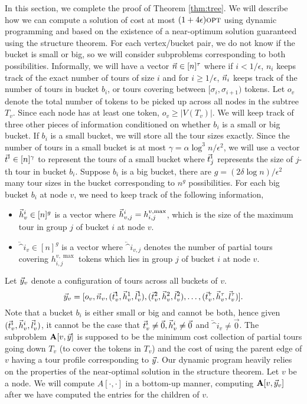 \documentclass[twoside,leqno]{article}
\newcommand{\opt}{\mbox{\sc opt}}
\newcommand{\eps}{\epsilon}
\begin{document}
In this section, we complete the proof of Theorem \ref{thm:tree}. We will describe how we can compute a solution of cost at most $(1 + 4\eps)\opt$ using dynamic programming and based on the existence of a near-optimum solution guaranteed using the structure theorem.
For each vertex/bucket pair, we do not know if the bucket is small or big, so we will consider subproblems corresponding to both possibilities. Informally, we will have a vector $\vec{n} \in [n]^{\tau}$ where if $i < 1/\eps$, $n_i$ keeps track of the exact number of tours of size $i$ and for $i \ge 1/\eps$, $\vec{n}_i$ keeps track of the number of tours in bucket $b_i$, or tours covering between $[\sigma_i, \sigma_{i+1})$ tokens. Let $o_v$ denote the total number of tokens to be picked up across all nodes in the subtree $T_v$. Since each node has at least one token, $o_v \ge |V(T_v)|$. We will keep track of three other pieces of information conditioned on whether $b_i$ is a small or big bucket. If $b_i$ is a small bucket, we will store all the tour sizes exactly. Since the number of tours in a small bucket is at most $\gamma = \alpha \log^3n /\eps^2$, we will use a vector $\vec{t}^i \in [n]^\gamma$ to represent the tours of a small bucket where $\vec{t}^i_j$ represents the size of $j$-th tour in bucket $b_i$. Suppose $b_i$ is a big bucket, there are $g = (2\delta \log n)/\eps^2 $ many tour sizes in the bucket corresponding to $n^g$ possibilities. For each big bucket $b_i$ at node $v$, we need to keep track of the following information,
\begin{itemize}
    \item $\vec{h}^i_v \in [n]^g$ is a vector where $\vec{h}^i_{v,j} = h^{v, \max}_{i,j}$, which is the size of the maximum tour in group $j$ of bucket $i$ at node $v$.
    \item $\lvec^i_v \in [n]^g$ is a vector where $\lvec^i_{v,j}$ denotes the number of partial tours covering $h^{v, \max}_{i,j}$ tokens which lies in group $j$ of bucket $i$ at node $v$.
\end{itemize}
Let $\vec{y}_v$ denote a configuration of tours across all buckets of $v$.
$$\vec{y}_v = [o_v, \vec{n}_v, (\vec{t}_v^1, \vec{h}_v^1, \vec{l}_v^1), (\vec{t}_v^2, \vec{h}_v^2, \vec{l}_v^2), \ldots, (\vec{t}_v^\tau, \vec{h}_v^\tau, \vec{l}_v^\tau)].$$
Note that a bucket $b_i$ is either small or big and cannot be both, hence given $(\vec{t}^i_v, \vec{h}^i_v, \vec{l}^i_v)$, it cannot be the case that $\vec{t}^i_v \neq \vec{0}, \vec{h}^i_v \neq \vec{0}$ and $\lvec^i_v \neq \vec{0}$.
The subproblem $\textbf{A}[v, \vec{y}]$ is supposed to be the minimum cost collection of partial tours going down $T_v$ (to cover the tokens in $T_v$) and the cost of using the parent edge of $v$ having a tour profile corresponding to $\vec{y}$. Our dynamic program heavily relies on the properties of the near-optimal solution in the structure theorem.  Let $v$ be a node. We will compute $A[\cdot, \cdot]$ in a bottom-up manner, computing $\textbf{A}[v, \vec{y}_v]$ after we have computed the entries for the children of $v$.
\end{document}
